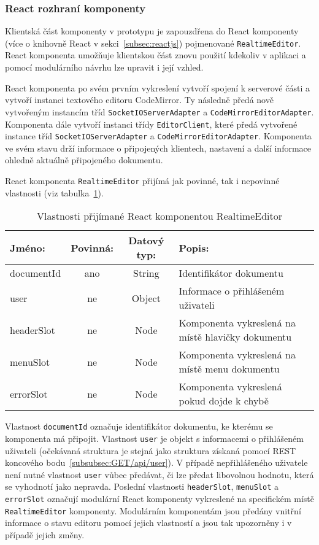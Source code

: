 
\subsubsection{React rozhraní komponenty}

Klientská část komponenty v prototypu je zapouzdřena do React komponenty (více o knihovně React v sekci~\ref{subsec:reactjs}) pojmenované \texttt{RealtimeEditor}.
React komponenta umožňuje klientskou část znovu použití kdekoliv v aplikaci a pomocí modulárního návrhu lze upravit i její vzhled.

React komponenta po svém prvním vykreslení vytvoří spojení k serverové části a vytvoří instanci textového editoru CodeMirror.
Ty následně předá nově vytvořeným instancím tříd \texttt{SocketIOServerAdapter} a \texttt{CodeMirrorEditorAdapter}.
Komponenta dále vytvoří instanci třídy \texttt{EditorClient}, které předá vytvořené instance tříd \texttt{SocketIOServerAdapter} a \texttt{CodeMirrorEditorAdapter}.
Komponenta ve svém stavu drží informace o připojených klientech, nastavení a další informace ohledně aktuálně připojeného dokumentu.

React komponenta \texttt{RealtimeEditor} přijímá jak povinné, tak i nepovinné vlastnosti (viz tabulka~\ref{tab:reactKomponenta}).

\begin{table}[ht!]\centering
\caption{Vlastnosti přijímané React komponentou RealtimeEditor}\label{tab:reactKomponenta}

\begin{tabular}{l c c p{5.5cm}}
    Jméno: & Povinná: & Datový typ: & Popis:\\ \hline
    documentId & ano & String & Identifikátor dokumentu\\ \hline
    user & ne & Object & Informace o přihlášeném uživateli\\ \hline
    headerSlot & ne & Node & Komponenta vykreslená na místě hlavičky dokumentu \\ \hline
    menuSlot & ne & Node & Komponenta vykreslená na místě menu dokumentu \\ \hline
    errorSlot & ne & Node & Komponenta vykreslená pokud dojde k chybě \\
\end{tabular}
\end{table}

Vlastnost \texttt{documentId} označuje identifikátor dokumentu, ke kterému se komponenta má připojit.
Vlastnost \texttt{user} je objekt s informacemi o přihlášeném uživateli (očekávaná struktura je stejná jako struktura získaná pomocí \gls{REST} koncového bodu~\ref{subsubsec:GET/api/user}).
V případě nepřihlášeného uživatele není nutné vlastnost \texttt{user} vůbec předávat, či lze předat libovolnou hodnotu, která se vyhodnotí jako nepravda.
Poslední vlastnosti \texttt{headerSlot}, \texttt{menuSlot} a \texttt{errorSlot} označují modulární React komponenty vykreslené na specifickém místě \texttt{RealtimeEditor} komponenty.
Modulárním komponentám jsou předány vnitřní informace o stavu editoru pomocí jejich vlastností a jsou tak upozorněny i v případě jejich změny.

